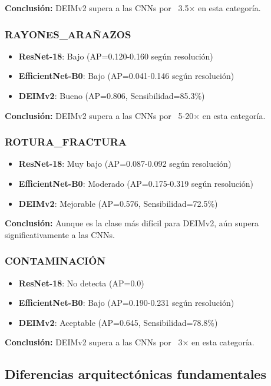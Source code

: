 \textbf{Conclusión:} DEIMv2 supera a las CNNs por ~3.5× en esta categoría.

\subsubsection{\mbox{RAYONES\_ARAÑAZOS}}
\begin{itemize}
    \item \textbf{ResNet-18}: Bajo (AP=0.120-0.160 según resolución)
    \item \textbf{EfficientNet-B0}: Bajo (AP=0.041-0.146 según resolución)
    \item \textbf{DEIMv2}: Bueno (AP=0.806, Sensibilidad=85.3\%)
\end{itemize}

\textbf{Conclusión:} DEIMv2 supera a las CNNs por ~5-20× en esta categoría.

\subsubsection{\mbox{ROTURA\_FRACTURA}}
\begin{itemize}
    \item \textbf{ResNet-18}: Muy bajo (AP=0.087-0.092 según resolución)
    \item \textbf{EfficientNet-B0}: Moderado (AP=0.175-0.319 según resolución)
    \item \textbf{DEIMv2}: Mejorable (AP=0.576, Sensibilidad=72.5\%)
\end{itemize}

\textbf{Conclusión:} Aunque es la clase más difícil para DEIMv2, aún supera significativamente a las CNNs.

\subsubsection{CONTAMINACIÓN}
\begin{itemize}
    \item \textbf{ResNet-18}: No detecta (AP=0.0)
    \item \textbf{EfficientNet-B0}: Bajo (AP=0.190-0.231 según resolución)
    \item \textbf{DEIMv2}: Aceptable (AP=0.645, Sensibilidad=78.8\%)
\end{itemize}

\textbf{Conclusión:} DEIMv2 supera a las CNNs por ~3× en esta categoría.

\FloatBarrier
\subsection{Diferencias arquitectónicas fundamentales}

